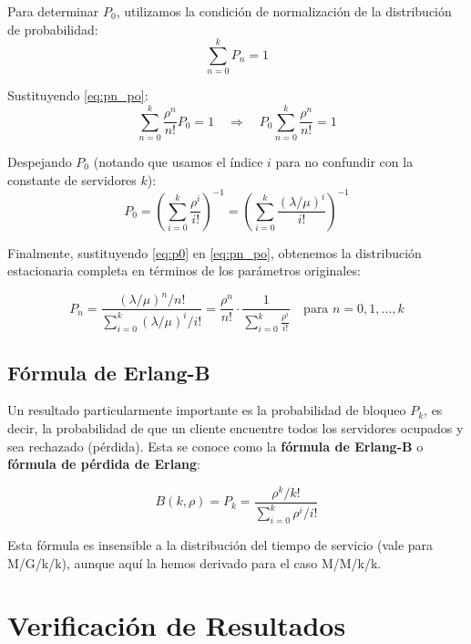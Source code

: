 \documentclass[12pt,a4paper]{article}
\theoremstyle{definition}
\begin{document}
Para determinar $P_0$, utilizamos la condición de normalización de la distribución de probabilidad:
\begin{equation}
    \sum_{n=0}^{k} P_n = 1
\end{equation}

Sustituyendo \eqref{eq:pn_po}:
\begin{equation}
    \sum_{n=0}^{k} \frac{\rho^n}{n!} P_0 = 1 \quad \Rightarrow \quad P_0 \sum_{n=0}^{k} \frac{\rho^n}{n!} = 1
\end{equation}

Despejando $P_0$ (notando que usamos el índice $i$ para no confundir con la constante de servidores $k$):
\begin{equation}
    \boxed{P_0 = \left( \sum_{i=0}^{k} \frac{\rho^i}{i!} \right)^{-1} = \left( \sum_{i=0}^{k} \frac{(\lambda/\mu)^i}{i!} \right)^{-1}}
    \label{eq:p0}
\end{equation}

Finalmente, sustituyendo \eqref{eq:p0} en \eqref{eq:pn_po}, obtenemos la distribución estacionaria completa en términos de los parámetros originales:

\begin{equation}
    \boxed{P_n = \frac{(\lambda/\mu)^n / n!}{\sum_{i=0}^{k} (\lambda/\mu)^i / i!} = \frac{\rho^n}{n!} \cdot \frac{1}{\sum_{i=0}^{k} \frac{\rho^i}{i!}} \quad \text{para } n = 0, 1, \ldots, k}
    \label{eq:pn_final}
\end{equation}

\subsection{Fórmula de Erlang-B}

Un resultado particularmente importante es la probabilidad de bloqueo $P_k$, es decir, la probabilidad de que un cliente encuentre todos los servidores ocupados y sea rechazado (pérdida). Esta se conoce como la \textbf{fórmula de Erlang-B} o \textbf{fórmula de pérdida de Erlang}:

\begin{equation}
    \boxed{B(k, \rho) = P_k = \frac{\rho^k / k!}{\sum_{i=0}^{k} \rho^i / i!}}
    \label{eq:erlangb}
\end{equation}

Esta fórmula es insensible a la distribución del tiempo de servicio (vale para M/G/k/k), aunque aquí la hemos derivado para el caso M/M/k/k.

\section{Verificación de Resultados}
\end{document}
